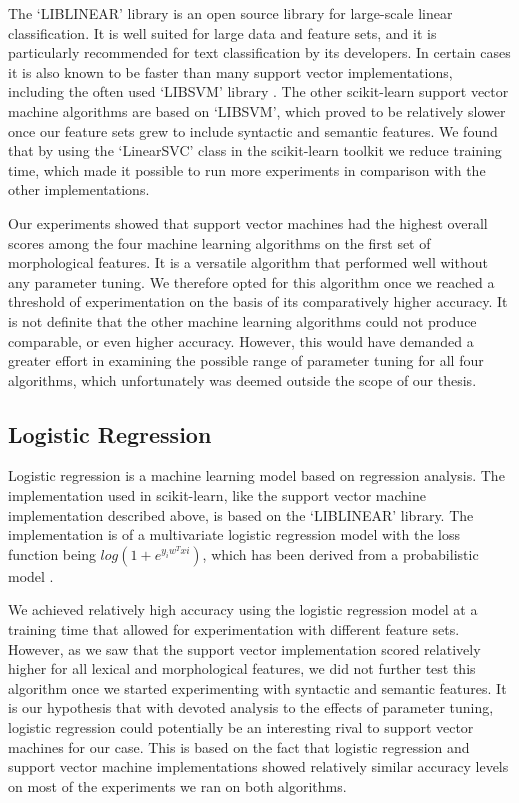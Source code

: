The `LIBLINEAR' library is an open source library for large-scale linear classification. It is well suited for large data and feature sets, and it is particularly recommended for text classification by its developers. In certain cases it is also known to be faster than many support vector implementations, including the often used `LIBSVM' library \cite{liblinear}. The other scikit-learn support vector machine algorithms are based on `LIBSVM', which proved to be relatively slower once our feature sets grew to include syntactic and semantic features. We found that by using the `LinearSVC' class in the scikit-learn toolkit we reduce training time, which made it possible to run more experiments in comparison with the other implementations. 

Our experiments showed that support vector machines had the highest overall scores among the four machine learning algorithms on the first set of morphological features. It is a versatile algorithm that performed well without any parameter tuning. We therefore opted for this algorithm once we reached a threshold of experimentation on the basis of its comparatively higher accuracy. It is not definite that the other machine learning algorithms could not produce comparable, or even higher accuracy. However, this would have demanded a greater effort in examining the possible range of parameter tuning for all four algorithms, which unfortunately was deemed outside the scope of our thesis.

\subsection{Logistic Regression}

Logistic regression is a machine learning model based on regression analysis. The implementation used in scikit-learn, like the support vector machine implementation described above, is based on the `LIBLINEAR' library. The implementation is of a multivariate logistic regression model with the loss function being $log(1+e^{y_iw^Txi})$, which has been derived from a probabilistic model \cite{liblinear}. 

We achieved relatively high accuracy using the logistic regression model at a training time that allowed for experimentation with different feature sets. However, as we saw that the support vector implementation scored relatively higher for all lexical and morphological features, we did not further test this algorithm once we started experimenting with syntactic and semantic features. It is our hypothesis that with devoted analysis to the effects of parameter tuning, logistic regression could potentially be an interesting rival to support vector machines for our case. This is based on the fact that logistic regression and support vector machine implementations showed relatively similar accuracy levels on most of the experiments we ran on both algorithms.

